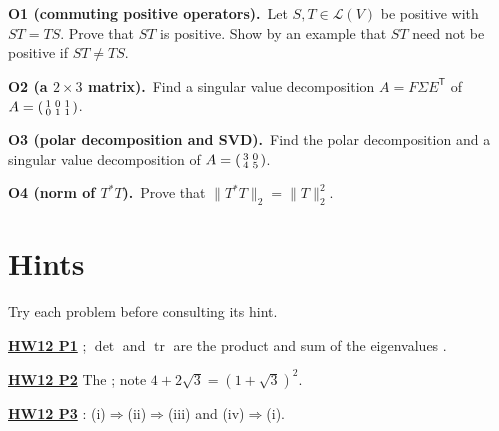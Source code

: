 \documentclass[10pt]{scrartcl}
\DeclareMathOperator{\tr}{tr}\DeclareMathOperator{\nul}{null}\DeclareMathOperator{\range}{range}\DeclareMathOperator{\spn}{span}
\newcommand{\LL}{\mathcal L}\newcommand{\PP}{\mathcal P}\newcommand{\MM}{\mathcal M}
\begin{document}
\begin{prob}
  \textbf{O1 (commuting positive operators).}\ Let $S,T\in\LL(V)$ be positive with $ST=TS$. Prove that $ST$ is positive. Show by an example that $ST$ need not be positive if $ST\neq TS$.

\end{prob}

\begin{prob}
  \textbf{O2 (a $2\times3$ matrix).}\ Find a singular value decomposition $A=F\Sigma E^{\mathsf T}$ of $A=\begin{psmallmatrix}1&0&1\\0&1&1\end{psmallmatrix}$.

\end{prob}

\begin{prob}
  \textbf{O3 (polar decomposition and SVD).}\ Find the polar decomposition and a singular value decomposition of $A=\begin{psmallmatrix}3&0\\4&5\end{psmallmatrix}$.

\end{prob}

\begin{prob}
  \textbf{O4 (norm of $T^*T$).}\ Prove that $\|T^*T\|_2=\|T\|_2^2$.

\end{prob}

\bigskip
\section*{Hints}
Try each problem before consulting its hint.

\par\medskip\noindent\textbf{\hyperlink{prob-HW12-P1}{HW12 P1}} ; $\det$ and $\tr$ are the product and sum of the eigenvalues .

\par\medskip\noindent\textbf{\hyperlink{prob-HW12-P2}{HW12 P2}} The ; note $4+2\sqrt{3}=(1+\sqrt{3})^2$.

\par\medskip\noindent\textbf{\hyperlink{prob-HW12-P3}{HW12 P3}} : (i)$\Rightarrow$(ii)$\Rightarrow$(iii) and (iv)$\Rightarrow$(i).
\end{document}
